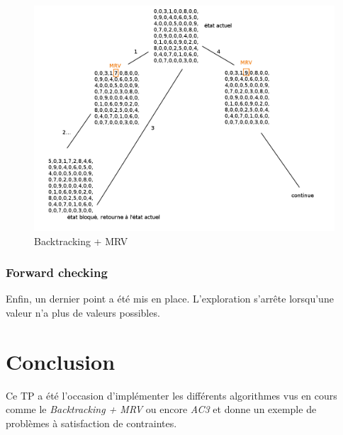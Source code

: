 \documentclass{article}
\begin{document}
\begin{figure}[h]
	\begin{center}
			\includegraphics[scale=0.4]{backtrackingmrv}
		\caption{Backtracking + MRV}
		\label{fig:backtrackingmrv}
	\end{center}
\end{figure}

\subsubsection{Forward checking}

Enfin, un dernier point a été mis en place. L'exploration s'arrête lorsqu'une valeur n'a plus de valeurs possibles.

\section{Conclusion}
Ce TP a été l'occasion d'implémenter les différents algorithmes vus en cours comme le \emph{Backtracking + MRV} ou encore \emph{AC3} et donne un exemple de problèmes à satisfaction de contraintes.
\end{document}
